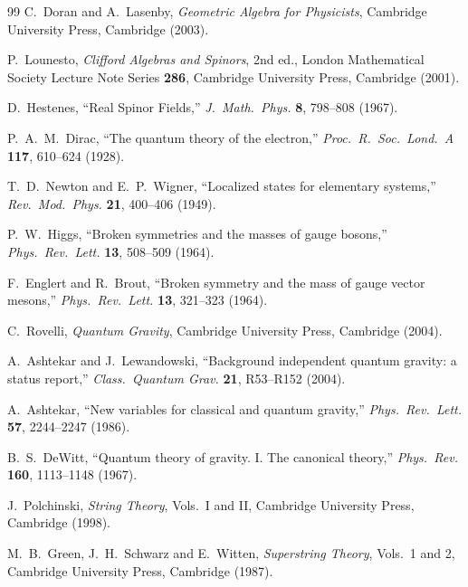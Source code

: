 \documentclass[dvipdfmx,11pt,a4paper]{article}
\begin{document}
\begin{thebibliography}{99}
C.~Doran and A.~Lasenby,
\textit{Geometric Algebra for Physicists},
Cambridge University Press, Cambridge (2003).

P.~Lounesto,
\textit{Clifford Algebras and Spinors}, 2nd ed.,
London Mathematical Society Lecture Note Series \textbf{286},
Cambridge University Press, Cambridge (2001).

D.~Hestenes,
``Real Spinor Fields,''
\textit{J.\ Math.\ Phys.} \textbf{8}, 798--808 (1967).

P.~A.~M.~Dirac,
``The quantum theory of the electron,''
\textit{Proc.\ R.\ Soc.\ Lond.\ A} \textbf{117}, 610--624 (1928).

T.~D.~Newton and E.~P.~Wigner,
``Localized states for elementary systems,''
\textit{Rev.\ Mod.\ Phys.} \textbf{21}, 400--406 (1949).

P.~W.~Higgs,
``Broken symmetries and the masses of gauge bosons,''
\textit{Phys.\ Rev.\ Lett.} \textbf{13}, 508--509 (1964).

F.~Englert and R.~Brout,
``Broken symmetry and the mass of gauge vector mesons,''
\textit{Phys.\ Rev.\ Lett.} \textbf{13}, 321--323 (1964).

C.~Rovelli,
\textit{Quantum Gravity},
Cambridge University Press, Cambridge (2004).

A.~Ashtekar and J.~Lewandowski,
``Background independent quantum gravity: a status report,''
\textit{Class.\ Quantum Grav.} \textbf{21}, R53--R152 (2004).

A.~Ashtekar,
``New variables for classical and quantum gravity,''
\textit{Phys.\ Rev.\ Lett.} \textbf{57}, 2244--2247 (1986).

B.~S.~DeWitt,
``Quantum theory of gravity. I. The canonical theory,''
\textit{Phys.\ Rev.} \textbf{160}, 1113--1148 (1967).

J.~Polchinski,
\textit{String Theory}, Vols.\ I and II,
Cambridge University Press, Cambridge (1998).

M.~B.~Green, J.~H.~Schwarz and E.~Witten,
\textit{Superstring Theory}, Vols.\ 1 and 2,
Cambridge University Press, Cambridge (1987).


\end{thebibliography}
\end{document}
